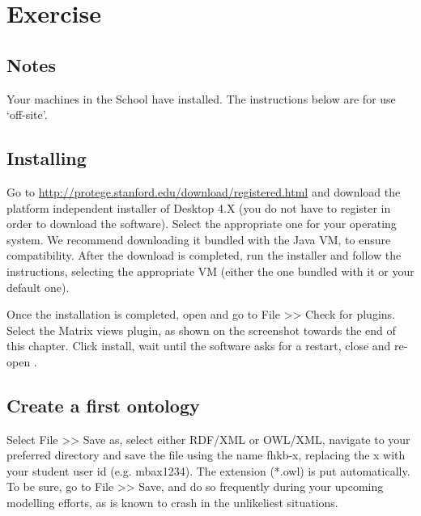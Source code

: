 \chapter{Exercise }
\addtocounter{excounter}{1}


\section{Notes}

Your machines in the School have \protege installed. The instructions below are for use `off-site'.

\section{Installing \protege}
Go to \url{http://protege.stanford.edu/download/registered.html} and download the platform independent installer of \protege Desktop 4.X (you do not have to register in order to download the software). Select the appropriate one for your operating system. We recommend downloading it bundled with the Java VM, to ensure compatibility. After the download is completed, run the installer and follow the instructions, selecting the appropriate VM (either the one bundled with it or your default one). 

Once the installation is completed, open \protege and go to File >> Check for plugins. Select the Matrix views plugin, as shown on the screenshot towards the end of this chapter. Click install, wait until the software asks for a restart, close and re-open \protege.

\section{Create a first ontology}
Select File >> Save as, select either RDF/XML or OWL/XML, navigate to your preferred directory and save the file using the name fhkb-x, replacing the x with your student user id (e.g. mbax1234). The extension (*.owl) is put automatically. To be sure, go to File >> Save, and do so frequently during your upcoming modelling efforts, as \protege is known to crash in the unlikeliest situations.

